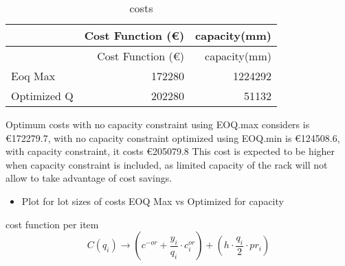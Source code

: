 \documentclass[
]{article}
\newenvironment{Shaded}{\begin{snugshade}}{\end{snugshade}}
\newcommand{\CommentTok}[1]{\textcolor[rgb]{0.56,0.35,0.01}{\textit{#1}}}
\providecommand{\tightlist}{%
  \setlength{\itemsep}{0pt}\setlength{\parskip}{0pt}}
\begin{document}
\begin{longtable}[]{@{}lrr@{}}
\caption{costs}\tabularnewline
\toprule
& Cost Function (€) & capacity(mm)\tabularnewline
\midrule
\endfirsthead
\toprule
& Cost Function (€) & capacity(mm)\tabularnewline
\midrule
\endhead
Eoq Max & 172280 & 1224292\tabularnewline
Optimized Q & 202280 & 51132\tabularnewline
\bottomrule
\end{longtable}

\begin{Shaded}
\end{Shaded}

Optimum costs with no capacity constraint using EOQ.max considers is
€172279.7, with no capacity constraint optimized using EOQ.min is
€124508.6, with capacity constraint, it costs €205079.8 This cost is
expected to be higher when capacity constraint is included, as limited
capacity of the rack will not allow to take advantage of cost savings.

\begin{Shaded}
\end{Shaded}

\begin{Shaded}
\end{Shaded}

\begin{itemize}
\tightlist
\item
  Plot for lot sizes of costs EOQ Max vs Optimized for capacity
\end{itemize}

cost function per item
\[ C(q_i) \rightarrow (c^{-or} +  \frac {y_i}{q_i} \cdot c_i^{or}) + (h \cdot  \frac {q_i}{2}\cdot pr_i ) \]
\end{document}
